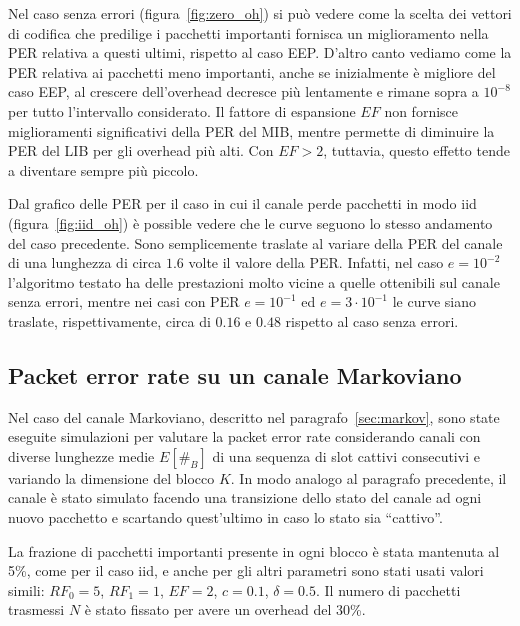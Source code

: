 \documentclass[italian, a4paper, 12pt]{article}
\begin{document}
Nel caso senza errori (figura~\ref{fig:zero_oh}) si può vedere come la
scelta dei vettori di codifica che predilige i pacchetti importanti
fornisca un miglioramento nella PER relativa a questi ultimi, rispetto
al caso EEP.
%
D'altro canto vediamo come la PER relativa ai pacchetti meno
importanti, anche se inizialmente è migliore del caso EEP, al crescere
dell'overhead decresce più lentamente e rimane sopra a $10^{-8}$ per
tutto l'intervallo considerato.
%
Il fattore di espansione $EF$ non fornisce miglioramenti significativi
della PER del MIB, mentre permette di diminuire la PER del LIB per gli
overhead più alti. Con $EF > 2$, tuttavia, questo effetto tende a
diventare sempre più piccolo.

Dal grafico delle PER per il caso in cui il canale perde pacchetti in
modo iid (figura~\ref{fig:iid_oh}) è possible vedere che le curve
seguono lo stesso andamento del caso precedente. Sono semplicemente
traslate al variare della PER del canale di una lunghezza di circa
$1.6$ volte il valore della PER.
%
Infatti, nel caso $e = 10^{-2}$ l'algoritmo testato ha delle
prestazioni molto vicine a quelle ottenibili sul canale senza errori,
mentre nei casi con PER $e = 10^{-1}$ ed $e = 3\cdot 10^{-1}$ le curve
siano traslate, rispettivamente, circa di $0.16$ e $0.48$ rispetto al
caso senza errori.

\subsection{Packet error rate su un canale Markoviano}
Nel caso del canale Markoviano, descritto nel
paragrafo~\ref{sec:markov}, sono state eseguite simulazioni per
valutare la packet error rate considerando canali con diverse
lunghezze medie $E[\#_B]$ di una sequenza di slot cattivi consecutivi
e variando la dimensione del blocco $K$.
%
In modo analogo al paragrafo precedente, il canale è stato simulato
facendo una transizione dello stato del canale ad ogni nuovo pacchetto
e scartando quest'ultimo in caso lo stato sia ``cattivo''.

La frazione di pacchetti importanti presente in ogni blocco è stata
mantenuta al 5\%, come per il caso iid, e anche per gli altri
parametri sono stati usati valori simili: $RF_0 = 5$, $RF_1 = 1$,
$EF=2$, $c=0.1$, $\delta=0.5$. Il numero di pacchetti trasmessi $N$ è
stato fissato per avere un overhead del 30\%.
\end{document}

